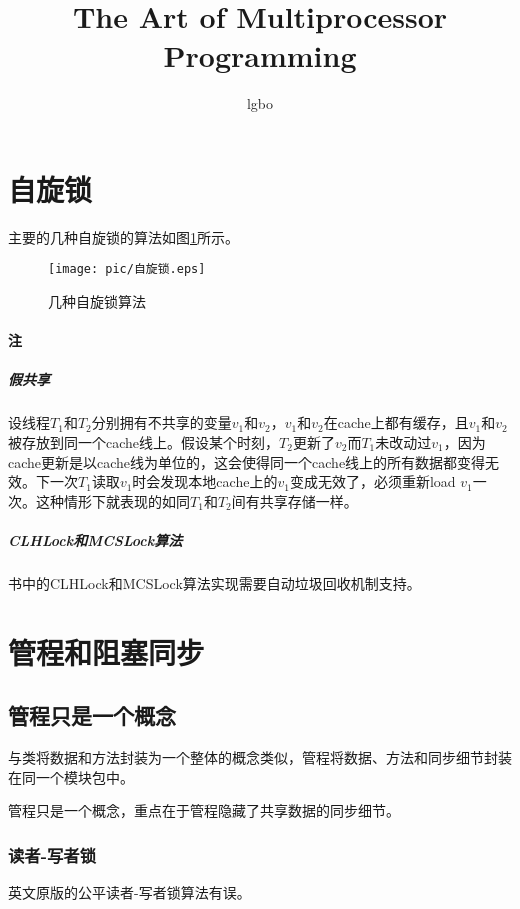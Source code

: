 \documentclass{article}
\title{The Art of Multiprocessor Programming}
\author{lgbo}
\begin{document}
\maketitle

\tableofcontents
\section{自旋锁}
主要的几种自旋锁的算法如图\ref{spinlocks}所示。
\begin{figure}[h]
	\centering
	\texttt{[image: pic/自旋锁.eps]}
	\caption{几种自旋锁算法\label{spinlocks}}
\end{figure}

\paragraph*{注}
\subparagraph*{假共享}
设线程$T_1$和$T_2$分别拥有不共享的变量$v_1$和$v_2$，$v_1$和$v_2$在cache上都有缓存，且$v_1$和$v_2$被存放到同一个cache线上。假设某个时刻，$T_2$更新了$v_2$而$T_1$未改动过$v_1$，因为cache更新是以cache线为单位的，这会使得同一个cache线上的所有数据都变得无效。下一次$T_1$读取$v_1$时会发现本地cache上的$v_1$变成无效了，必须重新load $v_1$一次。这种情形下就表现的如同$T_1$和$T_2$间有共享存储一样。
%
\subparagraph*{CLHLock和MCSLock算法}书中的CLHLock和MCSLock算法实现需要自动垃圾回收机制支持。

\section{管程和阻塞同步}
\subsection{管程只是一个概念}
与类将数据和方法封装为一个整体的概念类似，管程将数据、方法和同步细节封装在同一个模块包中。


管程只是一个概念，重点在于管程隐藏了共享数据的同步细节。

\subsubsection{读者-写者锁}
英文原版的公平读者-写者锁算法有误。
% 
\end{document}
